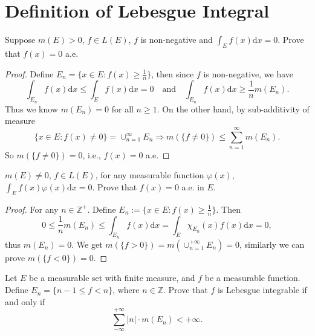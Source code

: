 
\section{Definition of Lebesgue Integral}

\begin{exercise}{}{}
  Suppose $m (E) > 0$, $f \in L(E)$, $f$ is non-negative and $\int_E f(x)\mathrm{d} x = 0$.
  Prove that $f(x) = 0$ a.e.
\end{exercise}

\begin{proof}
  Define $E_n = \{x \in E: f(x) \geq \frac{1}{n}\}$,
  then since $f$ is non-negative, we have
  \begin{equation}
    \int_{E_n} f(x)\mathrm{d} x \leq \int_E f(x)\mathrm{d} x = 0
    \quad
    \text{and}
    \quad
    \int_{E_n} f(x) \mathrm{d} x \geq \frac{1}{n} m(E_n).
  \end{equation}
  Thus we know $m(E_n) = 0$ for all $n \geq 1$.
  On the other hand, by sub-additivity of measure
  \begin{equation}
    \{x \in E: f(x) \neq 0\} = \cup_{n = 1}^{\infty} E_n
    \Rightarrow
    m(\{f \neq 0\}) \leq \sum_{n = 1}^{\infty} m(E_n).
  \end{equation}
  So $m(\{f \neq 0\}) = 0$, i.e., $f(x) = 0$ a.e.
\end{proof}

\begin{exercise}{}{}
  $m (E) \neq 0$, $f \in L(E)$, for any measurable function $\varphi(x)$,
  $\int_E f(x)\varphi(x)\mathrm{d} x = 0$. Prove that $f(x) = 0$ a.e. in $E$.
\end{exercise}

\begin{proof}
  For any $n \in \mathbb{Z}^+$. Define $E_n := \{x \in E: f(x) \geq \frac{1}{n}\}$.
  Then
  \begin{equation}
    0 \leq \frac{1}{n} m(E_n) \leq \int_{E_n} f(x)\mathrm{d} x = \int_E \chi_{E_n}(x) f(x)\mathrm{d} x = 0,
  \end{equation}
  thus $m(E_n) = 0$.
  We get $m(\{f > 0\}) = m(\cup_{n=1}^{+\infty} E_n) = 0$, similarly we can prove $m(\{f < 0\}) = 0$.
\end{proof}

\begin{exercise}{}{}
  Let $E$ be a measurable set with finite measure, and $f$ be a measurable function.
  Define $E_n = \{n - 1 \leq f < n\}$, where $n \in \mathbb{Z}$.
  Prove that $f$ is Lebesgue integrable if and only if
  \begin{equation}
    \sum\limits_{- \infty}^{+\infty} |n| \cdot m(E_n) < +\infty.
  \end{equation}
\end{exercise}

